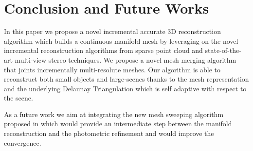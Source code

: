 \section{Conclusion and Future Works}
\label{sec:concl}
In this paper we propose a novel incremental accurate 3D reconstruction algorithm which builds a continuous manifold mesh by leveraging on the novel incremental reconstruction algorithms from sparse point cloud and state-of-the-art multi-view stereo techniques. 
We propose a novel mesh merging algorithm that joints incrementally multi-resolute meshes. 
Our algorithm is able to reconstruct both small objects and large-scenes thanks to the mesh representation and the underlying Delaunay Triangulation which is self adaptive with respect to the scene.

As a future work we aim at integrating the new mesh sweeping algorithm proposed in  \cite{romanoni16} which would provide an intermediate step between the manifold reconstruction and the photometric refinement and would improve the convergence.





